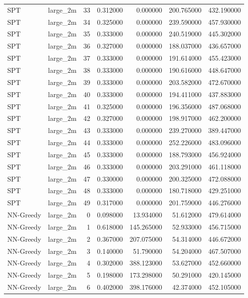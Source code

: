 \begin{tabular}{llrrrrr}
SPT & large_2m & 33 & 0.312000 & 0.000000 & 200.765000 & 432.190000 \\
SPT & large_2m & 34 & 0.325000 & 0.000000 & 239.590000 & 457.930000 \\
SPT & large_2m & 35 & 0.333000 & 0.000000 & 240.519000 & 445.302000 \\
SPT & large_2m & 36 & 0.327000 & 0.000000 & 188.037000 & 436.657000 \\
SPT & large_2m & 37 & 0.333000 & 0.000000 & 191.614000 & 455.423000 \\
SPT & large_2m & 38 & 0.333000 & 0.000000 & 190.616000 & 448.647000 \\
SPT & large_2m & 39 & 0.333000 & 0.000000 & 203.582000 & 472.670000 \\
SPT & large_2m & 40 & 0.333000 & 0.000000 & 194.411000 & 437.883000 \\
SPT & large_2m & 41 & 0.325000 & 0.000000 & 196.356000 & 487.068000 \\
SPT & large_2m & 42 & 0.327000 & 0.000000 & 198.917000 & 462.200000 \\
SPT & large_2m & 43 & 0.333000 & 0.000000 & 239.270000 & 389.447000 \\
SPT & large_2m & 44 & 0.333000 & 0.000000 & 252.226000 & 483.096000 \\
SPT & large_2m & 45 & 0.333000 & 0.000000 & 188.793000 & 456.924000 \\
SPT & large_2m & 46 & 0.333000 & 0.000000 & 203.291000 & 461.118000 \\
SPT & large_2m & 47 & 0.330000 & 0.000000 & 200.325000 & 472.088000 \\
SPT & large_2m & 48 & 0.333000 & 0.000000 & 180.718000 & 429.251000 \\
SPT & large_2m & 49 & 0.317000 & 0.000000 & 201.759000 & 446.276000 \\
NN-Greedy & large_2m & 0 & 0.098000 & 13.934000 & 51.612000 & 479.614000 \\
NN-Greedy & large_2m & 1 & 0.618000 & 145.265000 & 52.933000 & 456.715000 \\
NN-Greedy & large_2m & 2 & 0.367000 & 207.075000 & 54.314000 & 446.672000 \\
NN-Greedy & large_2m & 3 & 0.140000 & 51.790000 & 54.204000 & 467.507000 \\
NN-Greedy & large_2m & 4 & 0.302000 & 388.123000 & 53.627000 & 452.660000 \\
NN-Greedy & large_2m & 5 & 0.198000 & 173.298000 & 50.291000 & 420.145000 \\
NN-Greedy & large_2m & 6 & 0.402000 & 398.176000 & 42.374000 & 452.105000 \\

\end{tabular}
